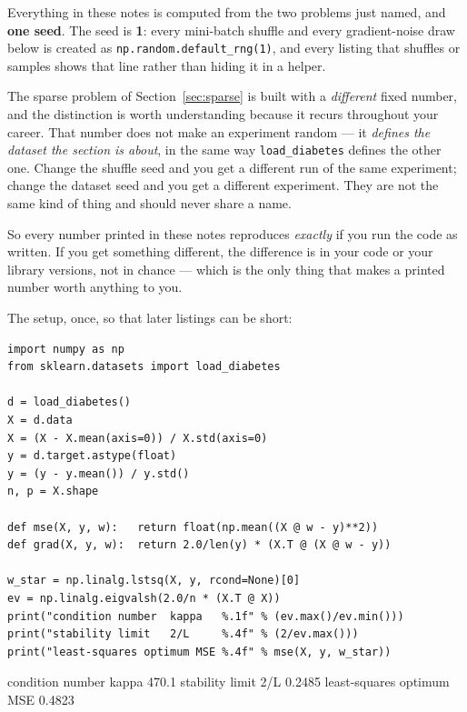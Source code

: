 \documentclass[11pt]{article}
\begin{document}
\begin{keyidea}
Everything in these notes is computed from the two problems just named, and
\textbf{one seed}. The seed is \textbf{1}: every mini-batch shuffle and every
gradient-noise draw below is created as \texttt{np.random.default\_rng(1)}, and
every listing that shuffles or samples shows that line rather than hiding it in
a helper.

The sparse problem of Section~\ref{sec:sparse} is built with a \emph{different}
fixed number, and the distinction is worth understanding because it recurs
throughout your career. That number does not make an experiment random --- it
\emph{defines the dataset the section is about}, in the same way
\texttt{load\_diabetes} defines the other one. Change the shuffle seed and you
get a different run of the same experiment; change the dataset seed and you get
a different experiment. They are not the same kind of thing and should never
share a name.

So every number printed in these notes reproduces \emph{exactly} if you run the
code as written. If you get something different, the difference is in your code
or your library versions, not in chance --- which is the only thing that makes a
printed number worth anything to you.
\end{keyidea}

The setup, once, so that later listings can be short:

\begin{lstlisting}
import numpy as np
from sklearn.datasets import load_diabetes

d = load_diabetes()
X = d.data
X = (X - X.mean(axis=0)) / X.std(axis=0)
y = d.target.astype(float)
y = (y - y.mean()) / y.std()
n, p = X.shape

def mse(X, y, w):   return float(np.mean((X @ w - y)**2))
def grad(X, y, w):  return 2.0/len(y) * (X.T @ (X @ w - y))

w_star = np.linalg.lstsq(X, y, rcond=None)[0]
ev = np.linalg.eigvalsh(2.0/n * (X.T @ X))
print("condition number  kappa   %.1f" % (ev.max()/ev.min()))
print("stability limit   2/L     %.4f" % (2/ev.max()))
print("least-squares optimum MSE %.4f" % mse(X, y, w_star))
\end{lstlisting}
\begin{codeout}
condition number  kappa   470.1
stability limit   2/L     0.2485
least-squares optimum MSE 0.4823
\end{codeout}
\end{document}
